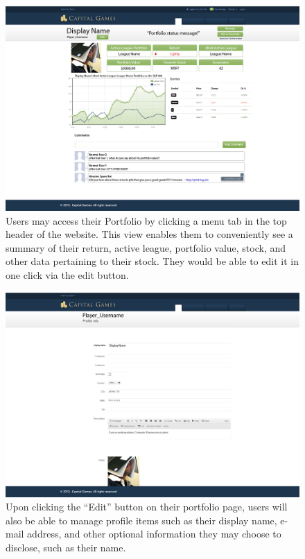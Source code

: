 {
\begin{figure}
\centering
\includegraphics[width=5.5in]{./mockups/JPEG/Portfolio.jpg}
\caption{Users may access their Portfolio by clicking a menu tab in the top header of the website. This view enables them to conveniently see a summary of their return, active league, portfolio value, stock, and other data pertaining to their stock. They would be able to edit it in one click via the edit button. }
\end{figure}
}


{
\begin{figure}
\centering
\includegraphics[width=5.5in]{./mockups/JPEG/ProfileManagement.jpg}
\caption{Upon clicking the ``Edit'' button on their portfolio page, users will also be able to manage profile items such as their display name, e-mail address, and other optional information they may choose to disclose, such as their name.}
\end{figure}
}


